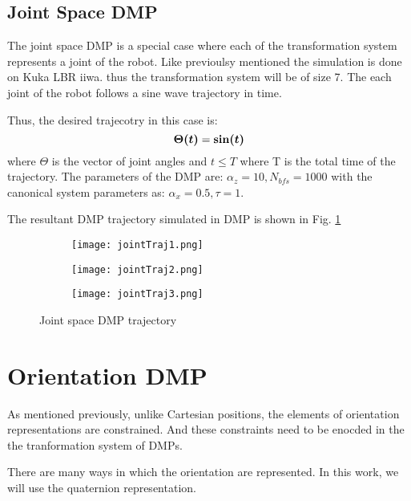 \subsection{Joint Space DMP}
The joint space DMP is a special case where each of the transformation system represents a joint of the robot.
Like previoulsy mentioned the simulation is done on Kuka LBR iiwa. thus the transformation system will be of size 7.
The each joint of the robot follows a sine wave trajectory in time. 

Thus, the desired trajecotry in this case is:
\begin{equation}
    \boldsymbol{\Theta(t)} = \boldsymbol{\sin(t)} 
\end{equation}
where $\Theta$ is the vector of joint angles and $t \leq T$ where T is the total time of the trajectory.
The parameters of the DMP are: $\alpha_z = 10, N_{bfs} = 1000$ with the canonical system parameters as: 
$\alpha_x = 0.5, \tau = 1$.

The resultant DMP trajectory simulated in DMP is shown in Fig. \ref{fig:joint_traj_pybullet}

\begin{figure}[h]
    \centering
    \begin{subfigure}{0.3\textwidth}
        \texttt{[image: jointTraj1.png]}
    \end{subfigure}%
    \begin{subfigure}{0.3\textwidth}
        \texttt{[image: jointTraj2.png]}
    \end{subfigure}%
    \begin{subfigure}{0.3\textwidth}
        \texttt{[image: jointTraj3.png]}
    \end{subfigure}%
    \caption{Joint space DMP trajectory}
    \label{fig:joint_traj_pybullet}

\end{figure}

\section{Orientation DMP}
As mentioned previously, unlike Cartesian positions, the elements of orientation representations are constrained.
And these constraints need to be enocded in the the tranformation system of DMPs.

There are many ways in which the orientation are represented. In this work, we will use the quaternion representation.

